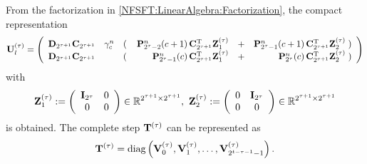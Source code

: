 From the factorization in \eqref{NFSFT:LinearAlgebra:Factorization}, the compact representation
\begin{equation}
\nonumber
\mathbf{U}^{(\tau)}_l = 
\left(\begin{array}{lclrcr}
  \mathbf{D}_{2^{\tau+1}} \mathbf{C}_{2^{\tau+1}} & \gamma_{c}^n & \left(\right. & \mathbf{P}_{2^{\tau}-2}^n{\hspace{-0.4ex}}\left(c+1\right) \mathbf{C}^{\text{\rm{T}}}_{2^{\tau+1}} \mathbf{Z}_{1}^{(\tau)} & + & 
  \mathbf{P}_{2^{\tau}-1}^n{\hspace{-0.4ex}}\left(c+1\right) \mathbf{C}^{\text{\rm{T}}}_{2^{\tau+1}} \mathbf{Z}_{2}^{(\tau)} \left.\right) \\
  \mathbf{D}_{2^{\tau+1}} \mathbf{C}_{2^{\tau+1}} & & \left(\right. & \mathbf{P}_{2^{\tau}-1}^n{\hspace{-0.4ex}}\left(c\right) \mathbf{C}^{\text{\rm{T}}}_{2^{\tau+1}} \mathbf{Z}_{1}^{(\tau)} & + & 
  \mathbf{P}_{2^{\tau}}^n{\hspace{-0.4ex}}\left(c\right) \mathbf{C}^{\text{\rm{T}}}_{2^{\tau+1}} \mathbf{Z}_{2}^{(\tau)} \left.\right)
\end{array}\right)
\end{equation}
with 
\[
  \mathbf{Z}_{1}^{(\tau)} := 
    \left(\begin{array}{cc}
      \mathbf{I}_{2^{\tau}} & 0\\
      0 & 0
    \end{array}\right) \in \mathbb{R}^{2^{\tau+1} \times 2^{\tau+1}},\
  \mathbf{Z}_{2}^{(\tau)} := 
    \left(\begin{array}{cc}
      0 & \mathbf{I}_{2^{\tau}} \\
      0 & 0
    \end{array}\right) \in \mathbb{R}^{2^{\tau+1} \times 2^{\tau+1}}    
\]
is obtained.
The complete step $\mathbf{T}^{(\tau)}$ can be represented as 
\[
  \mathbf{T}^{(\tau)} = \text{diag}\left(\mathbf{V}^{(\tau)}_0,\mathbf{V}^{(\tau)}_1,\dots,\mathbf{V}^{(\tau)}_{2^{t-\tau-1}-1}\right).
\]

